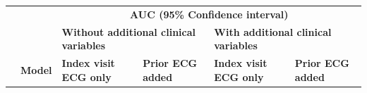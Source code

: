 \documentclass[preprint]{elsarticle}
\begin{document}
\renewcommand{\arraystretch}{1.2}
\begin{table}[H]
  \centering
  \scriptsize
\begin{adjustbox}{center}
\begin{tabular}{@{}llcccc@{}}
  \toprule
  & & \multicolumn{4}{c}{\textbf{AUC (95\% Confidence interval)}} \\
  \cmidrule(lr){3-6}
  & & \multicolumn{2}{l}{\textbf{Without additional clinical variables}} & \multicolumn{2}{l}{\textbf{With additional clinical variables}} \\
  \cmidrule(lr){3-4}\cmidrule(lr){5-6}
  & \multicolumn{1}{l}{\textbf{Model}} & \multicolumn{1}{l}{\textbf{Index visit ECG only}} & \multicolumn{1}{l}{\textbf{Prior ECG added}} & \multicolumn{1}{l}{\textbf{Index visit ECG only}} & \multicolumn{1}{l}{\textbf{Prior ECG added}} \\
  \midrule


\end{tabular}
\end{adjustbox}
\end{table}
\end{document}
